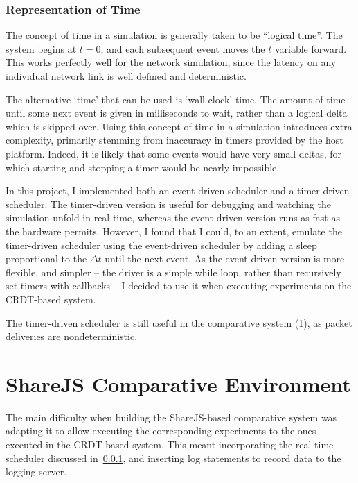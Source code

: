 \documentclass[12pt,a4paper,twoside,openright]{report}
\begin{document}
		\subsubsection{Representation of Time} \label{sec:rtscheduler}
		The concept of time in a simulation is generally taken to be ``logical time''. The system begins at $t = 0$, and each subsequent event moves the $t$ variable forward. This works perfectly well for the network simulation, since the latency on any individual network link is well defined and deterministic.
		
		The alternative `time' that can be used is `wall-clock' time. The amount of time until some next event is given in milliseconds to wait, rather than a logical delta which is skipped over. Using this concept of time in a simulation introduces extra complexity, primarily stemming from inaccuracy in timers provided by the host platform. Indeed, it is likely that some events would have very small deltas, for which starting and stopping a timer would be nearly impossible. 
		
		In this project, I implemented both an event-driven scheduler and a timer-driven scheduler. The timer-driven version is useful for debugging and watching the simulation unfold in real time, whereas the event-driven version runs as fast as the hardware permits. However, I found that I could, to an extent, emulate the timer-driven scheduler using the event-driven scheduler by adding a sleep proportional to the $\Delta t$ until the next event. As the event-driven version is more flexible, and simpler -- the driver is a simple while loop, rather than recursively set timers with callbacks -- I decided to use it when executing experiments on the CRDT-based system.
		
		The timer-driven scheduler is still useful in the comparative system (\cref{sec:comparative}), as packet deliveries are nondeterministic.
			
			
\section{ShareJS Comparative Environment} \label{sec:comparative}

	The main difficulty when building the ShareJS-based comparative system was adapting it to allow executing the corresponding experiments to the ones executed in the CRDT-based system. This meant incorporating the real-time scheduler discussed in~\cref{sec:rtscheduler}, and inserting log statements to record data to the logging server.
	
\end{document}
